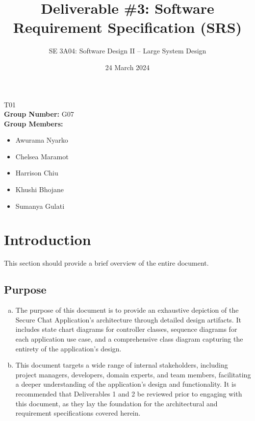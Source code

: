 \documentclass[]{article}
\title{Deliverable \#3: Software Requirement Specification (SRS)}
\author{SE 3A04: Software Design II -- Large System Design}
\date{24 March 2024}
\begin{document}
\maketitle
{} T01\\
{\bf Group Number:} G07 \\
{\bf Group Members:}
\begin{itemize}
	\item Awurama Nyarko
	\item Chelsea Maramot
	\item Harrison Chiu
	\item Khushi Bhojane
	\item Sumanya Gulati
\end{itemize}

\section{Introduction}
\label{sec:introduction}

This section should provide a brief overview of the entire document.

\subsection{Purpose}
\label{sub:purpose}
\begin{enumerate}[a)]
    \item The purpose of this document is to provide an exhaustive depiction of the Secure Chat Application's architecture through detailed design artifacts. It includes state chart diagrams for controller classes, sequence diagrams for each application use case, and a comprehensive class diagram capturing the entirety of the application's design.
    \item This document targets a wide range of internal stakeholders, including project managers, developers, domain experts, and team members, facilitating a deeper understanding of the application's design and functionality. It is recommended that Deliverables 1 and 2 be reviewed prior to engaging with this document, as they lay the foundation for the architectural and requirement specifications covered herein.
\end{enumerate}
\end{document}
